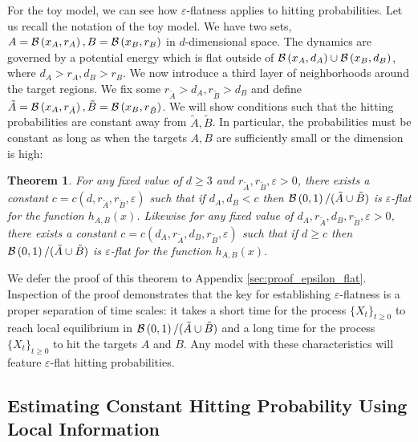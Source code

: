 \documentclass[english, aip, jcp, priprint, graphicx,floatfix]{revtex4-1}
\newtheorem{theorem}{Theorem}
\theoremstyle{plain}
\theoremstyle{definition}
\theoremstyle{plain}
\begin{document}
For the toy model, we can see how  $\varepsilon$-flatness applies to hitting probabilities.  Let us recall the notation of the toy model.  We have two sets, $A=\mathcal{B}\left(x_A,r_A\right),B=\mathcal{B}\left(x_B,r_B\right)$ in $d$-dimensional space.  The dynamics are governed by a potential energy which is flat outside of $\mathcal{B}\left(x_A,d_A\right)\cup\mathcal{B}\left(x_B,d_B\right)$, where $d_A>r_A,d_B>r_B$.  We now introduce a third layer of neighborhoods around the target regions.  We fix some $r_{\tilde A}>d_A,r_{\tilde B}>d_B$ and define $\tilde A=\mathcal{B}\left(x_A,r_{\tilde A}\right),\tilde B=\mathcal{B}\left(x_B,r_{\tilde B}\right)$.  We will show conditions such that the hitting probabilities are constant away from $\tilde A,\tilde B$.  In particular, the probabilities must be constant as long as when the targets $A, B$ are sufficiently small or the dimension is high:

\begin{theorem}\label{thm:epsilon_flat}
For any fixed value of $d \geq 3$ and $r_{\tilde{A}}, r_{\tilde{B}}, \varepsilon > 0$, there exists a constant $c=c(d, r_{\tilde{A}}, r_{\tilde{B}}, \varepsilon)$ such that if $d_{A}, d_{B} < c$ then $\mathcal{B}\left(0, 1\right) / (\tilde{A} \cup \tilde{B})$ is $\varepsilon$-flat for the function $h_{A,B}(x)$.  Likewise for any fixed value of $d_{A}, r_{\tilde{A}}, d_{B}, r_{\tilde{B}}, \varepsilon>0$, there exists a constant $c=c(d_{A}, r_{\tilde{A}}, d_{B}, r_{\tilde{B}}, \varepsilon)$ such that if $d \geq c$ then $\mathcal{B}\left(0, 1\right) / (\tilde{A} \cup \tilde{B})$ is $\varepsilon$-flat for the function $h_{A,B}(x)$.
\end{theorem}

We defer the proof of this theorem to Appendix \ref{sec:proof_epsilon_flat}. Inspection of the proof demonstrates that the key for establishing $\varepsilon$-flatness is a proper separation of time scales: it takes a short time for the process $\{X_t\}_{t\geq 0}$ to reach local equilibrium in $\mathcal{B}\left(0, 1\right) / (\tilde{A} \cup \tilde{B})$ and a long time for the process $\{X_t\}_{t\geq 0}$ to hit the targets $A$ and $B$.  Any model with these characteristics will feature $\varepsilon$-flat hitting probabilities.

\subsection{Estimating Constant Hitting Probability Using Local Information}
\end{document}
